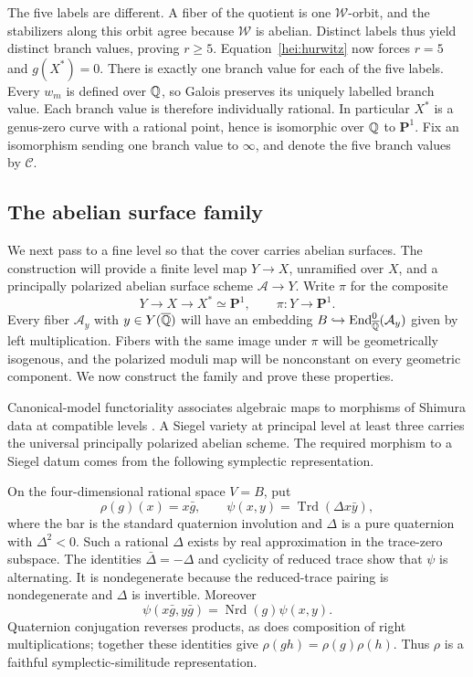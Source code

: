 The five labels are different.  A fiber of the quotient is one
$\mathcal W$-orbit, and the stabilizers along this orbit agree because
$\mathcal W$ is abelian.  Distinct labels thus yield distinct branch
values, proving $r\ge5$.  Equation~\eqref{hei:hurwitz} now forces
$r=5$ and $g(X^*)=0$.  There is exactly one branch value for each of
the five labels.  Every $w_m$ is defined over $\mathbb Q$, so Galois preserves
its uniquely labelled branch value.  Each branch value is therefore
individually rational.  In particular $X^*$ is a genus-zero curve
with a rational point, hence is isomorphic over $\mathbb Q$ to
$\mathbf P^1$.  Fix an isomorphism sending one branch value to
$\infty$, and denote the five branch values by $\mathcal C$.

\newpage
\subsection{The abelian surface family}

We next pass to a fine level so that the cover carries abelian
surfaces.  The construction will provide a finite level map $Y\to X$,
unramified over $X$, and a principally polarized abelian surface
scheme $\mathcal A\to Y$.  Write $\pi$ for the composite
\[
 Y\longrightarrow X\longrightarrow X^*\simeq\mathbf P^1,
 \qquad \pi:Y\longrightarrow\mathbf P^1.
\]
Every fiber $\mathcal A_y$ with $y\in Y(\overline{\mathbb Q})$ will have an embedding
$B\hookrightarrow\operatorname{End}^0_{\overline{\mathbb Q}}(\mathcal A_y)$
given by left multiplication.
Fibers with the same image under $\pi$ will be geometrically isogenous,
and the polarized moduli map will be nonconstant on every geometric
component.  We now construct the family and prove these properties.

Canonical-model functoriality associates algebraic maps to morphisms
of Shimura data at compatible levels
\cite{Deligne1971,Deligne1979}.  A Siegel variety at principal level
at least three carries the universal principally polarized abelian
scheme.  The required morphism to a Siegel datum comes from the
following symplectic representation.

On the four-dimensional rational space $V=B$, put
\[
 \rho(g)(x)=x\bar g,\qquad
 \psi(x,y)=\operatorname{Trd}(\Delta x\bar y),
\]
where the bar is the standard quaternion involution and $\Delta$ is a
pure quaternion with $\Delta^2<0$.  Such a rational $\Delta$ exists
by real approximation in the trace-zero subspace.  The identities
$\bar\Delta=-\Delta$ and cyclicity of reduced trace show that $\psi$
is alternating.  It is nondegenerate because the reduced-trace
pairing is nondegenerate and $\Delta$ is invertible.  Moreover
\[
 \psi(x\bar g,y\bar g)=\operatorname{Nrd}(g)\psi(x,y).
\]
Quaternion conjugation reverses products, as does composition of
right multiplications; together these identities give
$\rho(gh)=\rho(g)\rho(h)$.
Thus $\rho$ is a faithful symplectic-similitude representation.

